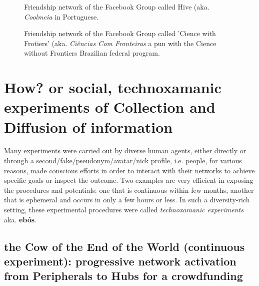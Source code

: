 \documentclass[a4paper]{article}
\begin{document}
\begin{figure}
  \centering
  \caption{Friendship network of the Facebook Group called Hive (aka. \emph{Coolmeia} in Portuguese.}
\end{figure}

\begin{figure}
  \centering
  \caption{Friendship network of the Facebook Group called 'Cience with Frotiers' (aka. \emph{Ciências Com Fronteiras} a pun with the Cience without Frontiers Brazilian federal program.}
\end{figure}


\section{How? or social, technoxamanic experiments of Collection and Diffusion of information}
Many experiments were carried out by diverse human agents, either directly or
through a second/fake/pseudonym/avatar/nick profile, i.e. people, for various
reasons, made conscious efforts in order to interact with their networks to
achieve specific goals or inspect the outcome.  Two examples are very efficient
in exposing the procedures and potentials: one that is continuous within few
months, another that is ephemeral and occurs in only a few hours or less.  In such
a diversity-rich setting, these experimental procedures were called
\emph{technoxamanic experiments} aka.  {\bf ebós}.

\subsection{the Cow of the End of the World (continuous experiment):
progressive network activation from Peripherals to Hubs for a crowdfunding}\label{cont}
\end{document}
